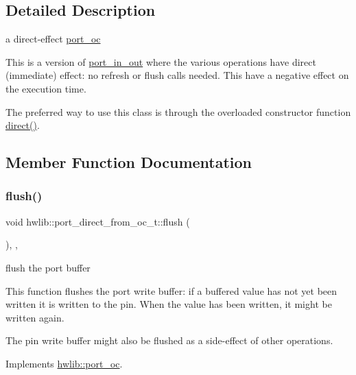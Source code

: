 \subsection{Detailed Description}
a direct-\/effect \hyperlink{classhwlib_1_1port__oc}{port\+\_\+oc}

This is a version of \hyperlink{classhwlib_1_1port__in__out}{port\+\_\+in\+\_\+out} where the various operations have direct (immediate) effect\+: no refresh or flush calls needed. This have a negative effect on the execution time.

The preferred way to use this class is through the overloaded constructor function \hyperlink{namespacehwlib_a43941b7f246ad934ee43dbfa0f5c8b5a}{direct()}. 

\subsection{Member Function Documentation}
\mbox{\label{classhwlib_1_1port__direct__from__oc__t_a3fe125af1f9ce2a5db5aa01b20c4d92e}} 
\subsubsection{\texorpdfstring{flush()}{flush()}}
{\footnotesize\ttfamily void hwlib\+::port\+\_\+direct\+\_\+from\+\_\+oc\+\_\+t\+::flush (\begin{DoxyParamCaption}{ }\end{DoxyParamCaption})\hspace{0.3cm}{\ttfamily [inline]}, {\ttfamily [override]}, {\ttfamily [virtual]}}





flush the port buffer

This function flushes the port write buffer\+: if a buffered value has not yet been written it is written to the pin. When the value has been written, it might be written again.

The pin write buffer might also be flushed as a side-\/effect of other operations. 

Implements \hyperlink{classhwlib_1_1port__oc_a49b64bd24431b35e92e208df84327dae}{hwlib\+::port\+\_\+oc}.

